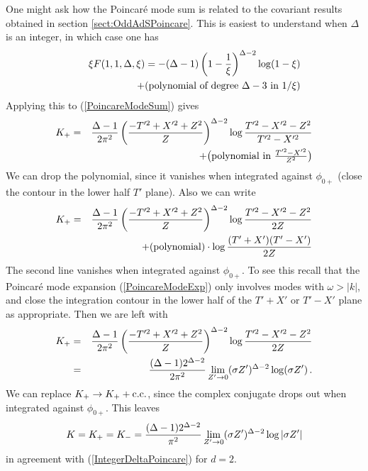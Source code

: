 \documentclass[12pt]{article}
\newcommand{\bea}{\begin{eqnarray}}
\newcommand{\eea}{\end{eqnarray}}
\begin{document}
One might ask how the Poincar\'e mode sum is related to the covariant
results obtained in section \ref{sect:OddAdSPoincare}.  This is
easiest to understand when $\Delta$ is an integer, in which case one
has
\begin{eqnarray}
& & \xi F(1,1,\Delta,\xi) = - (\Delta - 1) \left(1 - {1 \over \xi}\right)^{\Delta - 2} \log(1 - \xi) \\
\nonumber
& & \qquad\qquad\qquad + (\hbox{\rm polynomial of degree $\Delta - 3$ in $1/\xi$})
\end{eqnarray}
Applying this to (\ref{PoincareModeSum}) gives
%
\bea
\nonumber
K_+ & = & {\Delta - 1 \over 2 \pi^2} \left({-T'^2 + X'^2 + Z^2 \over Z}\right)^{\Delta - 2}
\log {T'^2 - X'^2 - Z^2 \over T'^2 - X'^2} \\
& & \qquad + \big(\hbox{\rm polynomial in ${T'^2 - X'^2 \over Z^2}$}\big)
\eea
%
We can drop the polynomial, since it vanishes when integrated against $\phi_{0+}$ (close the contour in the
lower half $T'$ plane).  Also we can write
%
\bea
\nonumber
K_+ & = & {\Delta - 1 \over 2 \pi^2} \left({-T'^2 + X'^2 + Z^2 \over Z}\right)^{\Delta - 2}
\log {T'^2 - X'^2 - Z^2 \over 2 Z} \\
& & \qquad + ({\rm polynomial}) \cdot \log {(T'+X')(T'-X') \over 2Z}
\eea
%
The second line vanishes when integrated against $\phi_{0+}$.  To see this recall that the Poincar\'e mode
expansion (\ref{PoincareModeExp}) only involves modes with $\omega > \vert k \vert$, and close the integration
contour in the lower half of the $T'+X'$ or $T'-X'$ plane as appropriate.  Then we are left with
%
\bea
K_+ & = & {\Delta - 1 \over 2 \pi^2} \left({-T'^2 + X'^2 + Z^2 \over Z}\right)^{\Delta - 2}
\log {T'^2 - X'^2 - Z^2 \over 2 Z} \\
& = & {(\Delta - 1) 2^{\Delta - 2} \over 2 \pi^2} \lim_{Z' \rightarrow 0} (\sigma Z')^{\Delta - 2} \log (\sigma Z')\,.
\eea
%
We can replace $K_+ \rightarrow K_+ + {\rm c.c.}$, since the complex conjugate drops out when integrated
against $\phi_{0+}$.  This leaves
\begin{equation}
K = K_+ = K_- = {(\Delta - 1) 2^{\Delta - 2} \over \pi^2} \lim_{Z' \rightarrow 0} (\sigma Z')^{\Delta - 2}
\log \vert \sigma Z' \vert
\end{equation}
in agreement with (\ref{IntegerDeltaPoincare}) for $d = 2$.
\end{document}
